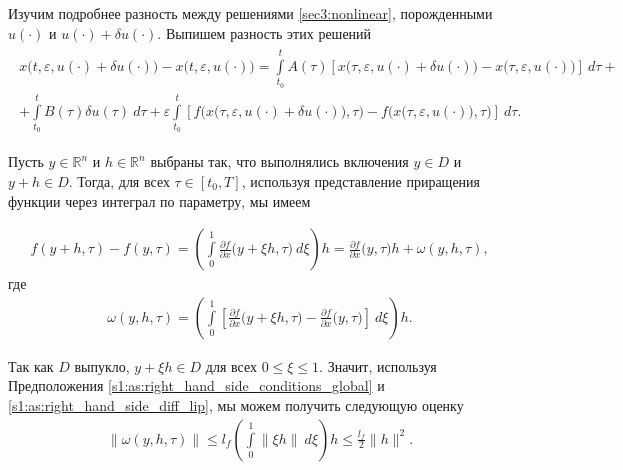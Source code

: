 \documentclass[../main.tex]{subfiles}
\begin{document}
Изучим подробнее разность между решениями \eqref{sec3:nonlinear}, порожденными $u(\cdot)$ и $u(\cdot) + \delta u(\cdot)$. 
Выпишем разность этих решений
\begin{gather}\label{diff_of_x}
 \begin{gathered}
 x\big(t,\varepsilon, u(\cdot) + \delta u(\cdot)\big) -
 x\big(t,\varepsilon, u(\cdot)\big) 
 = \int\limits_{t_0}^t A(\tau) \left[
 x\big(\tau,\varepsilon, u(\cdot) + \delta u(\cdot)\big) -
 x\big(\tau,\varepsilon, u(\cdot)\big) 
 \right]\ d\tau + \\ +
 \int\limits_{t_0}^t B(\tau) \delta u(\tau)\ d\tau +
 \varepsilon\int\limits_{t_0}^t \left[ 
 f\Big(x\big(\tau,\varepsilon, u(\cdot) + \delta u(\cdot)\big),\tau\Big) -
 f\Big(x\big(\tau,\varepsilon, u(\cdot)\big),\tau\Big)
 \right]\ d\tau.
 \end{gathered}
\end{gather}

Пусть $y \in \mathbb{R}^n$ и $h \in \mathbb{R}^n$ выбраны так, что выполнялись включения $y\in D$ и $y+h \in D$. 
Тогда, для всех $\tau \in [t_0,T]$, используя представление приращения функции через интеграл по параметру, мы имеем

\begin{gather*}
 f(y + h, \tau) - f(y,\tau) = 
 \left( \int\limits_{0}^{1} 
 \frac{\partial f}{\partial x} \big(y + \xi h, \tau\big)\ d\xi \right) h =
 \frac{\partial f}{\partial x} \big(y, \tau\big) h + \omega(y,h,\tau),
\end{gather*}
где 
\begin{gather*}
 \omega(y,h,\tau) = \left( \int\limits_{0}^{1} 
 \left[\frac{\partial f}{\partial x} \big(y + \xi h, \tau\big) -
 \frac{\partial f}{\partial x} \big(y, \tau\big) \right] \ d \xi \right) h.
\end{gather*}

Так как $D$ выпукло, $ y + \xi h \in D$ для всех $0 \leqslant \xi \leqslant 1$.
Значит, используя Предположения \ref{s1:as:right_hand_side_conditions_global} и \ref{s1:as:right_hand_side_diff_lip}, мы можем получить следующую оценку
\begin{gather*}
 \|\omega(y,h,\tau)\| \leqslant l_f \left( \int\limits_0^1 \left\| \xi h \right\| \ d\xi \right)h \leqslant \frac{l_f}{2} \|h\|^2.
\end{gather*}
\end{document}
